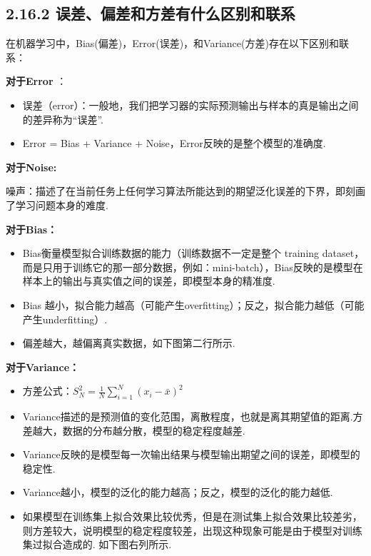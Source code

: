 \subsection{2.16.2
误差、偏差和方差有什么区别和联系}\label{ux8befux5deeux504fux5deeux548cux65b9ux5deeux6709ux4ec0ux4e48ux533aux522bux548cux8054ux7cfb}

在机器学习中，Bias(偏差)，Error(误差)，和Variance(方差)存在以下区别和联系：

\textbf{对于Error }：

\begin{itemize}
\item
  误差（error）：一般地，我们把学习器的实际预测输出与样本的真是输出之间的差异称为``误差''.
\item
  Error = Bias + Variance + Noise，Error反映的是整个模型的准确度.
\end{itemize}

\textbf{对于Noise:}

噪声：描述了在当前任务上任何学习算法所能达到的期望泛化误差的下界，即刻画了学习问题本身的难度.

\textbf{对于Bias：}

\begin{itemize}
\item
  Bias衡量模型拟合训练数据的能力（训练数据不一定是整个 training
  dataset，而是只用于训练它的那一部分数据，例如：mini-batch），Bias反映的是模型在样本上的输出与真实值之间的误差，即模型本身的精准度.
\item
  Bias
  越小，拟合能力越高（可能产生overfitting）；反之，拟合能力越低（可能产生underfitting）.
\item
  偏差越大，越偏离真实数据，如下图第二行所示.
\end{itemize}

\textbf{对于Variance：}

\begin{itemize}
\item
  方差公式：$S_{N}^{2}=\frac{1}{N}\sum_{i=1}^{N}(x_{i}-\bar{x})^{2}$
\item
  Variance描述的是预测值的变化范围，离散程度，也就是离其期望值的距离.方差越大，数据的分布越分散，模型的稳定程度越差.
\item
  Variance反映的是模型每一次输出结果与模型输出期望之间的误差，即模型的稳定性.
\item
  Variance越小，模型的泛化的能力越高；反之，模型的泛化的能力越低.
\item
  如果模型在训练集上拟合效果比较优秀，但是在测试集上拟合效果比较差劣，则方差较大，说明模型的稳定程度较差，出现这种现象可能是由于模型对训练集过拟合造成的.
  如下图右列所示.
\end{itemize}

